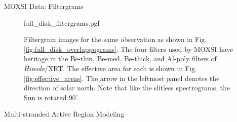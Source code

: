 \documentclass[final]{beamer}
\newlength{\colwidth}
\begin{document}
\begin{frame}[t]
\begin{columns}[t]
\begin{column}{\colwidth}
\begin{block}{MOXSI Data: Filtergrams}
    \vspace{-10pt}

    \begin{figure}
      \centering
      {full_disk_filtergrams.pgf}
      \caption{Filtergram images for the same observation as shown in Fig. \ref{fig:full_disk_overlappograms}. The four filters used by MOXSI have heritage in the Be-thin, Be-med, Be-thick, and Al-poly filters of \textit{Hinode}/XRT. The effective area for each is shown in Fig. \ref{fig:effective_areas}. The arrow in the leftmost panel denotes the direction of solar north. Note that like the slitless spectrograms, the Sun is rotated $90^\circ$.}
      \label{fig:full_disk_filtergrams}
    \end{figure}

  \end{block}

  \vspace{-35px}

  \begin{block}{Multi-stranded Active Region Modeling}


\end{block}
\end{column}
\end{columns}
\end{frame}
\end{document}

